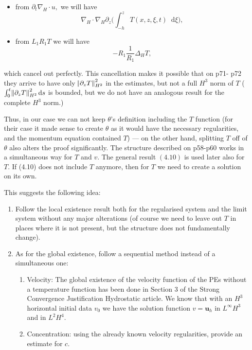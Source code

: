 \documentclass[11pt]{article}
\newcommand*\diff{\mathop{}\!\mathrm{d}}
\begin{document}
\begin{itemize}

  \item from $\partial_t \nabla_H \cdot u,$ we will have
  $$\nabla_H \cdot \nabla_H \partial_z \bigg (\int_{-h}^z T (x,z,\xi,t ) \diff \xi \bigg), $$
  
  \item from $L_1 R_1 T$ we will have
  $$ - R_1 \frac{1}{R_1} \Delta_H T,$$
  
\end{itemize}

which cancel out perfectly. This cancellation makes it possible that on p71- p72 they arrive to have only $\norm{\partial_z T}_{H^2}^2$ in the estimates, but not a full $H^3$ norm of $T$ ($\int_0^t \norm{\partial_z T}_{H^2}^2 \diff s$ is bounded, but we do not have an analogous result for the complete $H^3$ norm.)

Thus, in our case we can not keep $\theta$'s definition including the $T$ function (for their case it made sense to create $\theta$ as it would have the necessary regularities, and the momentum equation contained $T$) --- on the other hand, splitting $T$ off of $\theta$ also alters the proof significantly. The structure described on p58-p60 works in a simultaneous way for $T$ and $v.$ The general result $(4.10)$ is used later also for $T.$ If (4.10) does not include $T$ anymore, then for $T$ we need to create a solution on its own.

This suggests the following idea:

\begin{enumerate}

  \item Follow the local existence result both for the regularised system and the limit system without any major alterations (of course we need to leave out $T$ in places where it is not present, but the structure does not fundamentally change).
  
  \item As for the global existence, follow a sequential method instead of a simultaneous one:
  
  \begin{enumerate}
    \item Velocity: The global existence of the velocity function of the PEs without a temperature function has been done in Section 3 of the Strong Convergence Justification Hydrostatic article. We know that with an $H^3$ horizontal initial data $v_0$ we have the solution function $v = \mathbf{u}_h$ in $L^\infty H^3$ and in $L^2 H^4.$
    \item Concentration: using the already known velocity regularities, provide an estimate for $c.$
  \end{enumerate}

\end{enumerate}
\end{document}
